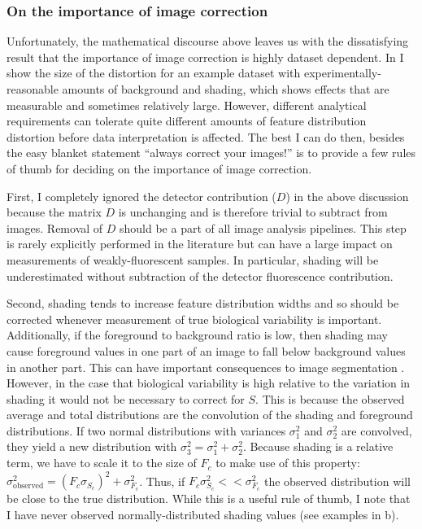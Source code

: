 \subsubsection{On the importance of image correction}

Unfortunately, the mathematical discourse above leaves us
with the dissatisfying result that the importance of image correction
is highly dataset dependent. In  I show
the size of the distortion for an example dataset with
experimentally-reasonable amounts of background and shading, which
shows effects that are measurable and sometimes relatively large. However,
different analytical requirements can tolerate quite different
amounts of feature distribution distortion before
data interpretation is affected.
The best I can do then, besides the easy blanket statement
``always correct your images!'' is to provide a few rules of thumb for
deciding on the importance of image correction.


First, I
completely ignored the detector contribution ($D$) in the above
discussion because
the matrix $D$ is unchanging and is therefore trivial to subtract from
images. Removal of $D$ should be a part of all image
analysis pipelines. This step is rarely explicitly performed
in the literature but can have a large impact
on measurements of weakly-fluorescent samples. In particular,
shading will be underestimated without subtraction of the detector
fluorescence contribution.


Second, shading tends to increase feature distribution widths
and so should be corrected whenever measurement of true biological
variability is important. Additionally, if the foreground to background ratio
is low, then shading may cause foreground values in one part of an image to fall below
background values in another part. This can have
important consequences to image segmentation 
\cite{Herbert2012}. However, in the case that biological
variability is high relative to the variation in shading
it would not be necessary to correct for $S$.
This is because the observed average and total distributions are
the convolution
of the shading and foreground distributions. If two normal distributions
with variances $\sigma^2_1$ and $\sigma^2_2$ are convolved, they yield a new
distribution with $\sigma^2_3=\sigma^2_1+\sigma^2_2$. Because shading
is a relative term, we have to scale it to the size of $F_c$ to make
use of this property: $\sigma^2_{\text{observed}}=(F_c\sigma_{S_c})^2+\sigma_{F_c}^2$.
Thus, if $F_c\sigma_{S_c}^2<<\sigma_{F_c}^2$ the observed
distribution will be close to the true distribution. While this
is a useful rule of thumb, I note that I have never observed normally-distributed
shading values (see examples in b).


